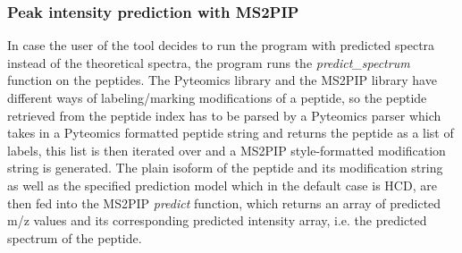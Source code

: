 \documentclass[11pt]{article}
\begin{document}
\subsubsection{Peak intensity prediction with MS2PIP}
In case the user of the tool decides to run the program with predicted spectra instead of the theoretical spectra, the program runs the \textit{predict\_spectrum} function on the peptides. The Pyteomics library and the MS2PIP library have different ways of labeling/marking modifications of a peptide, so the peptide retrieved from the peptide index has to be parsed by a Pyteomics parser which takes in a Pyteomics formatted peptide string and returns the peptide as a list of labels, this list is then iterated over and a MS2PIP style-formatted modification string is generated. The plain isoform of the peptide and its modification string as well as the specified prediction model which in the default case is HCD, are then fed into the MS2PIP \textit{predict} function, which returns an array of predicted m/z values and its corresponding predicted intensity array, i.e. the predicted spectrum of the peptide.
\end{document}

